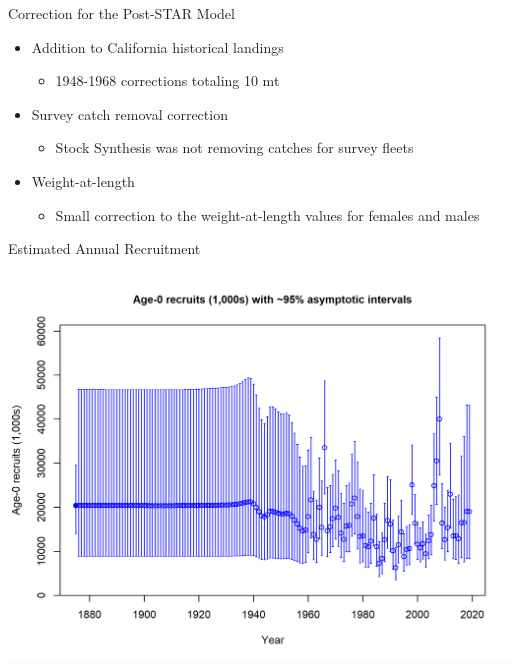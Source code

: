 \documentclass[pdf]{beamer}\usepackage[]{graphicx}\usepackage[]{color}
\begin{document}
\begin{frame}{Correction for the Post-STAR Model}
  \begin{itemize}
    \item Addition to California historical landings
      \begin{itemize}
        \item 1948-1968 corrections totaling 10 mt 
      \end{itemize}
    \item Survey catch removal correction
      \begin{itemize}
        \item Stock Synthesis was not removing catches for survey fleets
      \end{itemize}
    \item Weight-at-length
      \begin{itemize}
        \item Small correction to the weight-at-length values for females and males
      \end{itemize}    
  \end{itemize}
\end{frame}






\begin{frame}{Estimated Annual Recruitment}
  \begin{center}
    \includegraphics[scale = 0.50, trim={0cm 0cm 0cm 1.7cm}, clip]{r4ss/ts11_Age-0_recruits_(1000s)_with_95_asymptotic_intervals.png}
  \end{center}
\end{frame}
\end{document}
